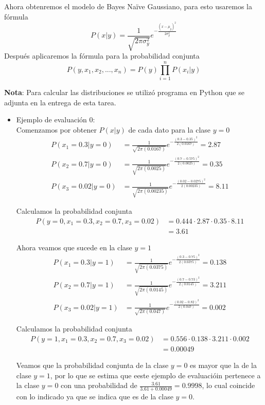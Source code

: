 Ahora obtenremos el modelo de Bayes Naïve Gaussiano, para esto usaremos la fórmula \[P(x|y) = \frac{1}{\sqrt{2\pi\sigma^2_y}} e^{-\frac{(x-\mu_y)^2}{2\sigma^2_y}}\] 
Después aplicaremos la fórmula para la probabilidad conjunta
\[ P(y, x_1, x_2, ... , x_n) = P(y) \prod_{i=1}^{n} P(x_i | y) \]

\textbf{Nota}: Para calcular las distribuciones se utilizó programa en Python que se adjunta en la entrega de esta tarea.

\newpage
\begin{itemize}
    \item Ejemplo de evaluación 0:\\
    Comenzamos por obtener $P(x|y)$ de cada dato para la clase $y=0$
    \begin{align*}
        P(x_1=0.3|y=0) & = \frac{1}{\sqrt{2\pi(0.0167)}} e^{-\frac{(0.3-0.35)^2}{2(0.0167)}} = 2.87 \\
        P(x_2=0.7|y=0) & = \frac{1}{\sqrt{2\pi(0.0025)}} e^{-\frac{(0.7-0.575)^2}{2(0.0025)}} = 0.35 \\
        P(x_3=0.02|y=0) & = \frac{1}{\sqrt{2\pi(0.00235)}} e^{-\frac{(0.02-0.0275)^2}{2(0.00235)}} = 8.11
    \end{align*}

    Calculamos la probabilidad conjunta
    \begin{align*}
        P(y=0, x_1=0.3, x_2=0.7, x_3=0.02) & = 0.444 \cdot 2.87 \cdot 0.35 \cdot 8.11 \\
        & = 3.61
    \end{align*}

    Ahora veamos que sucede en la clase $y=1$
    \begin{align*}
        P(x_1=0.3|y=1) & = \frac{1}{\sqrt{2\pi(0.0375)}} e^{-\frac{(0.3-0.75)^2}{2(0.0375)}} = 0.138 \\
        P(x_2=0.7|y=1) & = \frac{1}{\sqrt{2\pi(0.0145)}} e^{-\frac{(0.7-0.73)^2}{2(0.0145)}} = 3.211 \\
        P(x_3=0.02|y=1) & = \frac{1}{\sqrt{2\pi(0.047)}} e^{-\frac{(0.02-0.82)^2}{2(0.047)}} = 0.002
    \end{align*}

    Calculamos la probabilidad conjunta
    \begin{align*}
        P(y=1, x_1=0.3, x_2=0.7, x_3=0.02) & = 0.556 \cdot 0.138 \cdot 3.211 \cdot 0.002 \\
        & = 0.00049 
    \end{align*}
    
    Veamos que la probabilidad conjunta de la clase $y=0$ es mayor que la de la clase $y=1$, por lo que se estima que eeste ejemplo de evaluacióin pertenece a la clase $y=0$ con una probabilidad de $\frac{3.61}{3.61 + 0.00049} = 0.9998$, lo cual coincide con lo indicado ya que se indica que es de la clase $y=0$.


\end{itemize}
